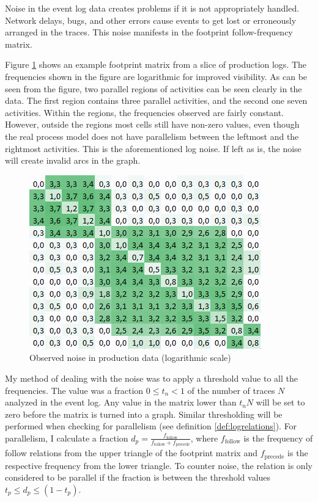 Noise in the event log data creates problems if it is not appropriately handled. 
Network delays, bugs, and other errors cause events to get lost or erroneously arranged in the traces. 
This noise manifests in the footprint follow-frequency matrix.

Figure \ref{fig:examplenoise} shows an example footprint matrix from a slice of production logs.
The frequencies shown in the figure are logarithmic for improved visibility.
As can be seen from the figure, two parallel regions of activities can be seen clearly in the data.
The first region contains three parallel activities, and the second one seven activities.
Within the regions, the frequencies observed are fairly constant.
However, outside the regions most cells still have non-zero values, even though the real process model
does not have parallelism between the leftmost and the rightmost activities.
This is the aforementioned log noise.
If left as is, the noise will create invalid arcs in the graph.

\begin{figure}[htb]
    \centering \includegraphics[width=0.6\linewidth]{gfx/graphs/noise.png}
    \caption{Observed noise in production data (logarithmic scale)}
    \label{fig:examplenoise}
\end{figure}

My method of dealing with the noise was to apply a threshold value to all the frequencies.
The value was a fraction $0 \le t_n < 1$ of the number of traces $N$ analyzed in the event log.
Any value in the matrix lower than $t_n N$ will be set to zero before the matrix is turned into a graph.
Similar thresholding will be performed when checking for parallelism (see definition \ref{def:logrelations}). 
For parallelism, I calculate a fraction $d_p = \frac{f_\text{follow}}{f_\text{follow} + f_\text{precede}}$, where $f_\text{follow}$ is the frequency of follow relations from the upper triangle of the footprint matrix and $f_\text{precede}$ is the respective frequency from the lower triangle.
To counter noise, the relation is only considered to be parallel if the fraction is between the threshold values $t_p \le d_p \le (1 - t_p)$. 

